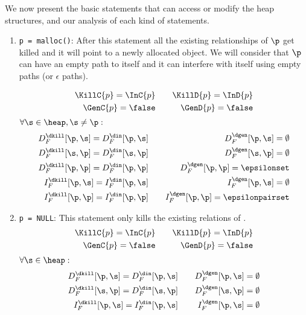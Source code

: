 We now present the basic statements that can access or modify
the heap structures, and our analysis of each kind of
statements.
\begin{enumerate}
\item {{\tt p = malloc()}}:
After this statement all the existing relationships of $\p$ get killed and it will point to a
newly allocated object. We will consider that $\p$ can have an empty path to itself and it can interfere
with itself using empty paths (or $\epsilon$ paths).

\begin{eqnarray*}
  \KillC{p}  = \InC{p} &\quad& \KillD{p} = \InD{p} \\
  \GenC{p} = \false 	 &\quad& \GenD{p} = \false 
\end{eqnarray*}
$\forall \s \in \heap, \s \not= \p:$
\begin{eqnarray*}
  D_F^{\dkill}[\p,\s]  =  D_F^{\din}[\p,\s] &\quad& D_F^{\dgen}[\p,\s]    =  \emptyset \\ 
  D_F^{\dkill}[\s,\p]  =  D_F^{\din}[\s,\p] &\quad& D_F^{\dgen}[\s,\p]    =  \emptyset \\
  D_F^{\dkill}[\p,\p]  =  D_F^{\din}[\p,\p] &\quad& D_F^{\dgen}[\p,\p]    =  \epsilonset\\
  I_F^{\dkill}[\p,\s]  =  I_F^{\din}[\p,\s] &\quad& I_F^{\dgen}[\p,\s]    =  \emptyset \\
  I_F^{\dkill}[\p,\p]  =  I_F^{\din}[\p,\p] &\quad& I_F^{\dgen}[\p,\p]    =  \epsilonpairset 
\end{eqnarray*}

\item{\tt p = NULL}:
This statement only kills the existing relations of \p.
\begin{eqnarray*}
  \KillC{p}  = \InC{p} &\quad& \KillD{p} = \InD{p} \\
  \GenC{p} = \false 	 &\quad& \GenD{p} = \false \\
\end{eqnarray*}
$\forall \s \in \heap:$
\begin{eqnarray*}
  D_F^{\dkill}[\p,\s]  =  D_F^{\din}[\p,\s] &\quad& D_F^{\dgen}[\p,\s]    =  \emptyset \\ 
  D_F^{\dkill}[\s,\p]  =  D_F^{\din}[\s,\p] &\quad& D_F^{\dgen}[\s,\p]    =  \emptyset \\
  I_F^{\dkill}[\p,\s]  =  I_F^{\din}[\p,\s] &\quad& I_F^{\dgen}[\p,\s]    =  \emptyset 
\end{eqnarray*}


\end{enumerate}
